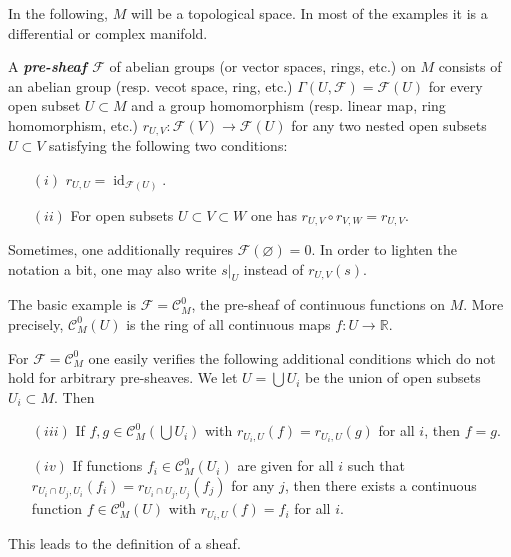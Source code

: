 \documentclass{article}
\newcommand{\R}{\mathbb{R}}
\newcommand{\Cc}{\mathcal{C}}
\newcommand{\Fc}{\mathcal{F}}
\DeclareMathOperator{\id}{id}
\begin{document}
In the following, $M$ will be a topological space. In most of the examples it is a differential or complex manifold.
\begin{defn}
	A \textbf{\textit{pre-sheaf $\Fc$}} of abelian groups (or vector spaces, rings, etc.) on $M$ consists of an abelian group (resp. vecot space, ring, etc.) $\Gamma(U,\Fc)=\Fc(U)$ for every open subset $U\subset M$ and a group homomorphism (resp. linear map, ring homomorphism, etc.) $r_{U,V}:\Fc(V)\to \Fc(U)$ for any two nested open subsets $U\subset V$ satisfying the following two conditions:
	\begin{enumerate}
		\item[$(i)$] $r_{U,U}=\id_{\Fc(U)}$.
		\item[$(ii)$] For open subsets $U\subset V\subset W$ one has $r_{U,V}\circ r_{V,W}=r_{U,V}$.
	\end{enumerate}
	Sometimes, one additionally requires $\Fc(\varnothing)=0$. In order to lighten the notation a bit, one may also write $s|_U$ instead of $r_{U,V}(s)$.
\end{defn}
\begin{example}
	The basic example is $\Fc=\Cc_M^0$, the pre-sheaf of continuous functions on $M$. More precisely, $\Cc_M^0(U)$ is the ring of all continuous maps $f:U\to\R$.
\end{example}
For $\Fc=\Cc_M^0$ one easily verifies the following additional conditions which do not hold for arbitrary pre-sheaves. We let $U=\bigcup U_i$ be the union of open subsets $U_i\subset M$. Then 
\begin{enumerate}
	\item[$(iii)$] If $f,g\in\Cc^0_M\left(\bigcup U_i\right)$ with $r_{U_i,U}(f)=r_{U_i,U}(g)$ for all $i$, then $f=g$.
	\item[$(iv)$] If functions $f_i\in\Cc_M^0(U_i)$ are given for all $i$ such that $r_{U_i\cap U_j,U_i}(f_i)=r_{U_i\cap U_j,U_j}(f_j)$ for any $j$, then there exists a continuous function $f\in\Cc^0_M(U)$ with $r_{U_i,U}(f)=f_i$ for all $i$.
\end{enumerate}
This leads to the definition of a sheaf.
\end{document}
